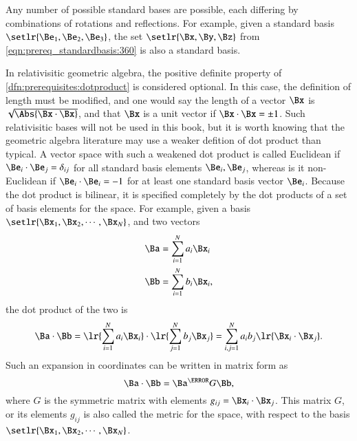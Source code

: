 
Any number of possible standard bases are possible, each differing by combinations of rotations and reflections.  For example, given a standard basis \( \setlr{ \Be_1, \Be_2, \Be_3 } \), the set \( \setlr{\Bx, \By, \Bz} \) from \cref{eqn:prereq_standardbasis:360} is also a standard basis.

In relativisitic geometric algebra, the positive definite property of \cref{dfn:prerequisites:dotproduct} is considered optional.
In this case, the definition of length must be modified, and one would say the length of a vector \( \Bx \) is \( \sqrt{\Abs{\Bx \cdot \Bx}} \), and that \( \Bx \) is a unit vector if \( \Bx \cdot \Bx = \pm 1 \).
Such relativisitic bases will not be used in this book, but it is worth knowing that the geometric algebra literature may use a weaker defition of dot product than typical.
A vector space
with such a weakened dot product is called Euclidean if \( \Be_i \cdot \Be_j = \delta_{ij} \) for all standard basis elements \( \Be_i, \Be_j \), whereas is it non-Euclidean if \( \Be_i \cdot \Be_i = -1 \) for at least one standard basis vector \( \Be_i \).
Because the dot product is bilinear, it is
specified completely by the dot products of a set of basis elements for the space.
For example,
given a basis \( \setlr{ \Bx_1, \Bx_2, \cdots, \Bx_N} \), and two vectors
\begin{dmath}\label{eqn:prereq_standardbasis:240}
\begin{aligned}
   \Ba &= \sum_{i = 1}^N a_i \Bx_i \\
   \Bb &= \sum_{i = 1}^N b_i \Bx_i,
\end{aligned}
\end{dmath}
the dot product of the two is
\begin{dmath}\label{eqn:prereq_standardbasis:260}
\Ba \cdot \Bb
=
   \lr{ \sum_{i = 1}^N a_i \Bx_i } \cdot
   \lr{ \sum_{j = 1}^N b_j \Bx_j }
=
   \sum_{i,j = 1}^N a_i b_j \lr{ \Bx_i \cdot \Bx_j }.
\end{dmath}
Such an expansion in coordinates can be written in matrix form as
\begin{dmath}\label{eqn:prereq_standardbasis:280}
\Ba \cdot \Bb
=
\Ba^\T G \Bb,
\end{dmath}
where \( G \) is the symmetric matrix with elements \( g_{ij} = \Bx_i \cdot \Bx_j \).
This matrix \( G \), or its elements \( g_{ij} \) is also called the metric for the space, with respect to the basis \( \setlr{ \Bx_1, \Bx_2, \cdots, \Bx_N} \).

